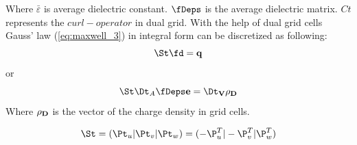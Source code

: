 Where $\bar{\varepsilon}$ is average dielectric constant. $\fDeps$ is the average dielectric matrix. $Ct$ represents the $curl-operator$ in dual grid.
With the help of dual grid cells Gauss' law (\ref{eq:maxwell_3}) in integral form can be discretized\cite{script_FeldSim} as following:
\begin{equation*}
\St\fd=\bf{q}
\label{eq:gausslaw}
\end{equation*}
or
\begin{equation*}
\St\Dt_{A}\fDeps\bf{e}=\Dt_{V}\bf{\rho}_{D}
\label{eq:gausslaw_sample}
\end{equation*}
Where $\bf{\rho}_{D}$ is the vector of the charge density in grid cells.

\begin{equation*}
\St=(\Pt_{u}|\Pt_{v}|\Pt_{w})=(-\P_{u}^{T}|-\P_{v}^{T}|\-\P_{w}^{T})
\label{eq:dual_S_matrix}
\end{equation*}
